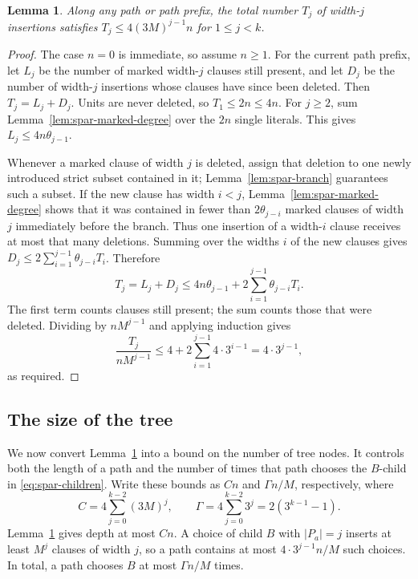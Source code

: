 \documentclass[11pt,reqno]{amsart}
\numberwithin{equation}{section}
\newtheorem{lemma}[theorem]{Lemma}
\theoremstyle{definition}\newtheorem{definition}[theorem]{Definition}
\theoremstyle{remark}\newtheorem{remark}[theorem]{Remark}
\renewcommand{\le}{\leqslant}
\renewcommand{\ge}{\geqslant}
\begin{document}
\begin{lemma}\label{lem:spar-insertion-bound}
Along any path or path prefix, the total number $T_j$ of width-$j$
insertions satisfies $T_j\le4(3M)^{j-1}n$ for $1\le j<k$.
\end{lemma}
\begin{proof}
The case $n=0$ is immediate, so assume $n\ge1$.
For the current path prefix, let $L_j$ be the number of marked
width-$j$ clauses still present, and let $D_j$ be the number of
width-$j$ insertions whose clauses have since been deleted.
Then $T_j=L_j+D_j$.
Units are never deleted, so $T_1\le2n\le4n$.
For $j\ge2$, sum Lemma~\ref{lem:spar-marked-degree} over the $2n$
single literals. This gives $L_j\le4n\theta_{j-1}$.

Whenever a marked clause of width $j$ is deleted, assign that deletion
to one newly introduced strict subset contained in it;
Lemma~\ref{lem:spar-branch} guarantees such a subset.
If the new clause has width $i<j$, Lemma~\ref{lem:spar-marked-degree}
shows that it was contained in fewer than $2\theta_{j-i}$ marked
clauses of width $j$ immediately before the branch.
Thus one insertion of a width-$i$ clause receives at most that
many deletions. Summing over the widths $i$ of the new clauses gives
$D_j\le2\sum_{i=1}^{j-1}\theta_{j-i}T_i$. Therefore
\begin{equation}\label{eq:spar-insertions}
 T_j=L_j+D_j\le4n\theta_{j-1}
       +2\sum_{i=1}^{j-1}\theta_{j-i}T_i.
\end{equation}
The first term counts clauses still present; the sum counts those that
were deleted. Dividing by $nM^{j-1}$ and applying induction gives
\[
 \frac{T_j}{nM^{j-1}}
 \le4+2\sum_{i=1}^{j-1}4\cdot3^{i-1}
 =4\cdot3^{j-1},
\]
as required.
\end{proof}

\subsection{The size of the tree}
We now convert Lemma~\ref{lem:spar-insertion-bound} into a bound on
the number of tree nodes. It controls both the length of a path
and the number of times that path chooses the $B$-child in
\eqref{eq:spar-children}. Write these bounds as $Cn$ and
$\Gamma n/M$, respectively, where
\[
 C=4\sum_{j=0}^{k-2}(3M)^j,\qquad
 \Gamma=4\sum_{j=0}^{k-2}3^j=2(3^{k-1}-1).
\]
Lemma~\ref{lem:spar-insertion-bound} gives depth at most $Cn$.
A choice of child $B$ with $|P_a|=j$ inserts at least $M^j$
clauses of width $j$, so a path contains at most
$4\cdot3^{j-1}n/M$ such choices.
In total, a path chooses $B$ at most $\Gamma n/M$ times.
\end{document}
